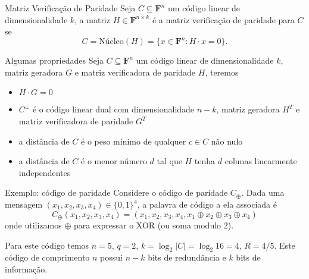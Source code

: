 \begin{frame}[allowframebreaks]
  \begin{block}{Matriz Verificação de Paridade}
   Seja $C \subseteq \mathbf{F}^n$ um código linear de dimensionalidade $k$, a matriz $H \in \mathbf{F}^{n \times k}$
   é a matriz verificação de paridade para $C$ se
   \begin{equation}
     C = \text{Núcleo}(H) = \{x \in \mathbf{F}^n: H\cdot x = 0\}.
   \end{equation}
  \end{block}

  \begin{block}{Algumas propriedades}
    Seja $C \subseteq \mathbf{F}^n$ um código linear de dimensionalidade $k$, matriz geradora $G$ e matriz verificadora de paridade $H$, teremos
    \begin{itemize}
      \item $H \cdot G = 0$
      \item $C^{\perp}$ é o código linear dual com dimensionalidade $n-k$, matriz geradora $H^T$ e matriz verificadora de paridade $G^T$
      \item a distância de $C$ é o peso mínimo de qualquer $c \in C$ não nulo
      \item a distância de $C$ é o menor número $d$ tal que $H$ tenha $d$ colunas linearmente independentes
    \end{itemize}
  \end{block}

  \framebreak
  \begin{block}{Exemplo: código de paridade}
    Considere o código de paridade $C_{\oplus}$. Dada uma mensagem $(x_1,x_2,x_3,x_4) \in \{0,1\}^4$, a palavra de código
    a ela associada é
    \begin{equation}
    C_{\oplus}(x_1,x_2,x_3,x_4) = (x_1,x_2,x_3,x_4, x_1 \oplus x_2 \oplus x_3 \oplus x_4)
    \end{equation}
    onde utilizamos $\oplus$ para expressar o XOR (ou soma modulo 2).

    Para este código temos $n=5$, $q=2$, $k=\log_2 \vert C \vert = \log_2 16 = 4$, $R=4/5$.
    Este código de comprimento $n$ possui $n-k$ bits de redundância e $k$ bits de informação.


\end{block}
\end{frame}
